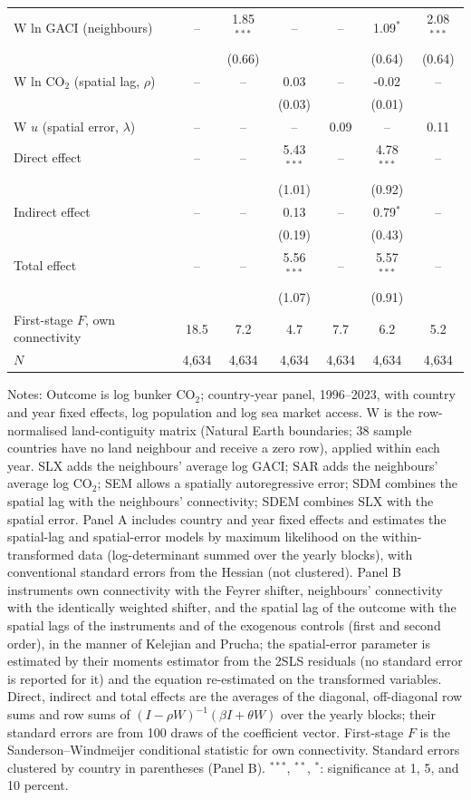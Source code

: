 \documentclass[12pt]{extarticle}
\begin{document}
\begin{table}[H]
{\begin{threeparttable}
\begin{tabular}{lcccccc}
  W ln GACI (neighbours) & -- & 1.85$^{***}$ & -- & -- & 1.09$^{*}$ & 2.08$^{***}$ \\
   &  & (0.66) &  &  & (0.64) & (0.64) \\
  W ln CO$_2$ (spatial lag, $\rho$) & -- & -- & 0.03 & -- & -0.02 & -- \\
   &  &  & (0.03) &  & (0.01) &  \\
  W $u$ (spatial error, $\lambda$) & -- & -- & -- & 0.09 & -- & 0.11 \\
  Direct effect & -- & -- & 5.43$^{***}$ & -- & 4.78$^{***}$ & -- \\
   &  &  & (1.01) &  & (0.92) &  \\
  Indirect effect & -- & -- & 0.13 & -- & 0.79$^{*}$ & -- \\
   &  &  & (0.19) &  & (0.43) &  \\
  Total effect & -- & -- & 5.56$^{***}$ & -- & 5.57$^{***}$ & -- \\
   &  &  & (1.07) &  & (0.91) &  \\
  First-stage $F$, own connectivity & 18.5 & 7.2 & 4.7 & 7.7 & 6.2 & 5.2 \\
  $N$ & 4,634 & 4,634 & 4,634 & 4,634 & 4,634 & 4,634 \\
\bottomrule
\end{tabular}
\begin{tablenotes}[flushleft]
\footnotesize
\item Notes: Outcome is log bunker CO$_2$; country-year panel, 1996--2023, with country and year fixed effects, log population and log sea market access. W is the row-normalised land-contiguity matrix (Natural Earth boundaries; 38 sample countries have no land neighbour and receive a zero row), applied within each year. SLX adds the neighbours' average log GACI; SAR adds the neighbours' average log CO$_2$; SEM allows a spatially autoregressive error; SDM combines the spatial lag with the neighbours' connectivity; SDEM combines SLX with the spatial error. Panel A includes country and year fixed effects and estimates the spatial-lag and spatial-error models by maximum likelihood on the within-transformed data (log-determinant summed over the yearly blocks), with conventional standard errors from the Hessian (not clustered). Panel B instruments own connectivity with the Feyrer shifter, neighbours' connectivity with the identically weighted shifter, and the spatial lag of the outcome with the spatial lags of the instruments and of the exogenous controls (first and second order), in the manner of Kelejian and Prucha; the spatial-error parameter is estimated by their moments estimator from the 2SLS residuals (no standard error is reported for it) and the equation re-estimated on the transformed variables. Direct, indirect and total effects are the averages of the diagonal, off-diagonal row sums and row sums of $(I-\rho W)^{-1}(\beta I + \theta W)$ over the yearly blocks; their standard errors are from 100 draws of the coefficient vector. First-stage $F$ is the Sanderson--Windmeijer conditional statistic for own connectivity. Standard errors clustered by country in parentheses (Panel B). $^{***}$, $^{**}$, $^{*}$: significance at 1, 5, and 10 percent.

\end{tablenotes}
\end{threeparttable}}
\end{table}
\end{document}
